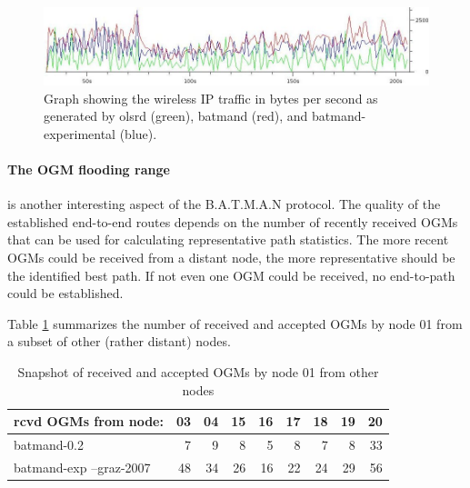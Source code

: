 \documentclass[11pt]{article}
\begin{document}
\begin{figure}[htb]
  \begin{center}
    \includegraphics[width=16cm]{io-graph-bat-bmx-olsr-select.jpg}
    \caption{Graph showing the wireless IP traffic in bytes per second as generated by olsrd (green), batmand (red), and batmand-experimental (blue).}
    \label{fig:protocol-traffic}
  \end{center}
\end{figure}


\paragraph{The OGM flooding range} is another interesting aspect of the B.A.T.M.A.N protocol. 
%
%
The quality of the established end-to-end routes depends on the number of recently received OGMs that can be used for calculating representative path statistics. The more recent OGMs could be received from a distant node, the more representative should be the identified best path.
%
If not even one OGM could be received, no end-to-path could be established.

Table \ref{tab:ogm-range} summarizes the number of received and accepted OGMs by node 01 from a subset of other (rather distant) nodes. 

\begin{table}[htb]
\begin{center}
\begin{tabular}{|l|rrrrrrrr|}

\hline
rcvd OGMs from node:    & 03 & 04 & 15 & 16 & 17 & 18 & 19 & 20 \\
\hline
batmand-0.2		& 7  & 9  & 8  & 5  & 8  & 7  & 8  & 33 \\
batmand-exp --graz-2007	& 48 & 34 & 26 & 16 & 22 & 24 & 29 & 56 \\
\hline
\end{tabular}
\caption{Snapshot of received and accepted OGMs by node 01 from other nodes}
\label{tab:ogm-range}
\end{center}
\end{table}%
\end{document}
